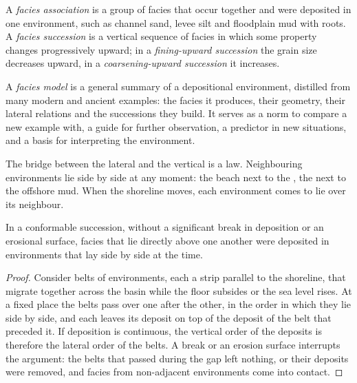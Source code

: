 \begin{definition}\label{def:b3:facies-models:association}
A \emph{facies association} is a group of facies
that occur together and were deposited in one environment, such as channel
sand, levee silt and floodplain mud with roots. A \emph{facies
succession} is a vertical sequence of facies in
which some property changes progressively upward; in a \emph{fining-upward
succession} the grain size decreases upward,
in a \emph{coarsening-upward succession}
it increases.
\end{definition}

\begin{definition}\label{def:b3:facies-models:model}
A \emph{facies model} is a general summary of a
depositional environment, distilled from many modern and ancient examples: the
facies it produces, their geometry, their lateral relations and the
successions they build. It serves as a norm to compare a new example with, a
guide for further observation, a predictor in new situations, and a basis for
interpreting the environment.
\end{definition}

The bridge between the lateral and the vertical is a law. Neighbouring
environments lie side by side at any moment: the beach next to the
, the  next to the offshore mud. When the shoreline moves,
each environment comes to lie over its neighbour.

\begin{theorem}\label{thm:b3:facies-models:walther}
In a conformable succession, without a significant break in deposition or an
erosional surface, facies that lie directly above one another were deposited
in environments that lay side by side at the time.
\end{theorem}

\begin{proof}
Consider belts of environments, each a strip parallel to the shoreline, that
migrate together across the basin while the floor subsides or the sea level
rises. At a fixed place the belts pass over one after the other, in the order
in which they lie side by side, and each leaves its deposit on top of the
deposit of the belt that preceded it. If deposition is continuous, the
vertical order of the deposits is therefore the lateral order of the belts.
A break or an erosion surface interrupts the argument: the belts that passed
during the gap left nothing, or their deposits were removed, and facies from
non-adjacent environments come into contact.
\end{proof}

